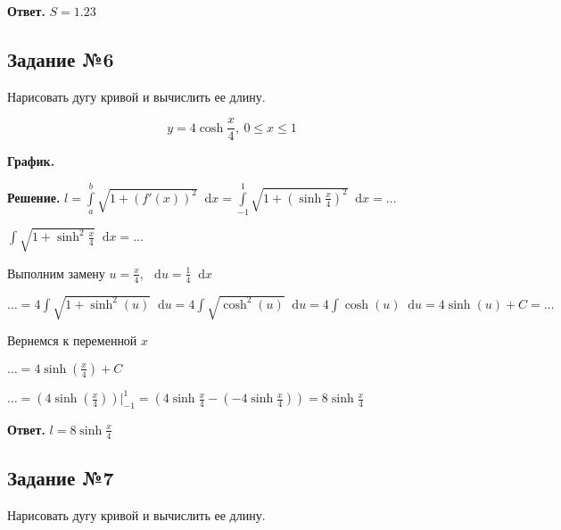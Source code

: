 \documentclass{article}
\newcommand*\diff{\mathop{}\!\mathrm{d}}
\begin{document}
\hfill

\textbf{Ответ.} $S = 1.23$

\subsection{Задание №6}

Нарисовать дугу кривой и вычислить ее длину.

$$
y = 4 \cosh \frac{x}{4}, \ 0 \le x \le 1
$$

\textbf{График.}

\begin{center}
\end{center}

\hfill

\textbf{Решение.} $l = \int\limits_{a}^{b} \sqrt{1 + (f'(x))^2} \diff x = \int\limits_{-1}^{1} \sqrt{1 + (\sinh \frac{x}{4})^2} \diff x = \dots$

$\int \sqrt{1 + \sinh^2 \frac{x}{4}} \diff x = \dots$

Выполним замену $u = \frac{x}{4}$, $\diff u = \frac{1}{4} \diff x$

$\dots = 4 \int \sqrt{1 + \sinh^2 (u)} \diff u = 4 \int \sqrt{\cosh^2 (u)} \diff u = 4 \int \cosh (u) \diff u = 4 \sinh (u) + C = \dots$

Вернемся к переменной $x$

$\dots = 4 \sinh (\frac{x}{4}) + C$

\hfill

$\dots = (4 \sinh (\frac{x}{4})) \bigg|_{-1}^{1} = (4 \sinh \frac{x}{4} - (- 4 \sinh \frac{x}{4})) = 8 \sinh \frac{x}{4}$

\hfill

\textbf{Ответ.} $l = 8 \sinh \frac{x}{4}$

\subsection{Задание №7}

Нарисовать дугу кривой и вычислить ее длину.
\end{document}
